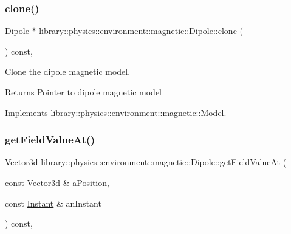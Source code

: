 \subsubsection{\texorpdfstring{clone()}{clone()}}
{\footnotesize\ttfamily \hyperlink{classlibrary_1_1physics_1_1environment_1_1magnetic_1_1_dipole}{Dipole} $\ast$ library\+::physics\+::environment\+::magnetic\+::\+Dipole\+::clone (\begin{DoxyParamCaption}{ }\end{DoxyParamCaption}) const\hspace{0.3cm}{\ttfamily [override]}, {\ttfamily [virtual]}}



Clone the dipole magnetic model. 

\begin{DoxyReturn}{Returns}
Pointer to dipole magnetic model 
\end{DoxyReturn}


Implements \hyperlink{classlibrary_1_1physics_1_1environment_1_1magnetic_1_1_model_a84e1a8fe50b33cab51821a9737dcead7}{library\+::physics\+::environment\+::magnetic\+::\+Model}.

\mbox{\label{classlibrary_1_1physics_1_1environment_1_1magnetic_1_1_dipole_a7d58a3d6e2f5255f67c727a42f3a7a63}} 
\subsubsection{\texorpdfstring{get\+Field\+Value\+At()}{getFieldValueAt()}}
{\footnotesize\ttfamily Vector3d library\+::physics\+::environment\+::magnetic\+::\+Dipole\+::get\+Field\+Value\+At (\begin{DoxyParamCaption}\item[{const Vector3d \&}]{a\+Position,  }\item[{const \hyperlink{classlibrary_1_1physics_1_1time_1_1_instant}{Instant} \&}]{an\+Instant }\end{DoxyParamCaption}) const\hspace{0.3cm}{\ttfamily [override]}, {\ttfamily [virtual]}}



